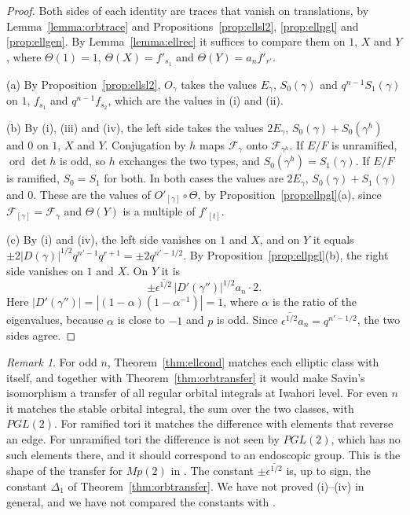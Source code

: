 \documentclass[12pt,letterpaper]{amsart}
\numberwithin{equation}{section}
\theoremstyle{definition}
\theoremstyle{remark}
\newtheorem{remark}[theorem]{Remark}
\DeclareMathOperator{\ord}{ord}
\begin{document}
\begin{proof}
Both sides of each identity are traces that vanish on translations, by
Lemma~\ref{lemma:orbtrace} and Propositions~\ref{prop:ellsl2},
\ref{prop:ellpgl} and \ref{prop:ellgen}. By Lemma~\ref{lemma:ellrec} it
suffices to compare them on $1$, $X$ and $Y$, where
$\Theta(1)=1$, $\Theta(X)=f'_{s_1}$ and $\Theta(Y)=a_nf'_{r'}$.

(a) By Proposition~\ref{prop:ellsl2}, $O_\gamma$ takes the values
$E_\gamma$, $S_0(\gamma)$ and $q^{n-1}S_1(\gamma)$ on $1$, $f_{s_1}$ and
$q^{n-1}f_{s_2}$, which are the values in (i) and (ii).

(b) By (i), (iii) and (iv), the left side takes the values
$2E_\gamma$, $S_0(\gamma)+S_0(\gamma^h)$ and $0$ on $1$, $X$ and $Y$.
Conjugation by $h$ maps $\mathcal F_\gamma$ onto $\mathcal
F_{\gamma^h}$. If $E/F$ is unramified, $\ord\det h$ is odd, so $h$
exchanges the two types, and $S_0(\gamma^h)=S_1(\gamma)$. If $E/F$ is
ramified, $S_0=S_1$ for both. In both cases the values are $2E_\gamma$,
$S_0(\gamma)+S_1(\gamma)$ and $0$. These are the values of
$O'_{[\gamma]}\circ\Theta$, by Proposition~\ref{prop:ellpgl}(a), since
$\mathcal F_{[\gamma]}=\mathcal F_\gamma$ and $\Theta(Y)$ is a multiple
of $f'_{[t]}$.

(c) By (i) and (iv), the left side vanishes on $1$ and $X$, and on $Y$
it equals $\pm2|D(\gamma)|^{1/2}q^{n'-1}q^{r+1}=\pm2q^{n'-1/2}$. By
Proposition~\ref{prop:ellpgl}(b), the right side vanishes on $1$ and
$X$. On $Y$ it is
\[
\pm\overline{\epsilon^{1/2}}\,|D'(\gamma'')|^{1/2}a_n\cdot2 .
\]
Here $|D'(\gamma'')|=|(1-\alpha)(1-\alpha^{-1})|=1$, where
$\alpha$ is the ratio of the eigenvalues, because $\alpha$ is close to
$-1$ and $p$ is odd. Since $\overline{\epsilon^{1/2}}a_n=q^{n'-1/2}$,
the two sides agree.
\end{proof}

\begin{remark}
\label{rem:ellmeaning}
For odd $n$, Theorem~\ref{thm:ellcond} matches each elliptic class with
itself, and together with Theorem~\ref{thm:orbtransfer} it would make
Savin's isomorphism a transfer of all regular orbital integrals at
Iwahori level. For even $n$ it matches the stable orbital integral, the
sum over the two classes, with $PGL(2)$. For ramified tori it matches
the difference with elements that reverse an edge. For unramified tori
the difference is not seen by $PGL(2)$, which has no such elements
there, and it should correspond to an endoscopic group. This is the
shape of the transfer for $Mp(2)$ in \cite{Li11}. The constant
$\pm\overline{\epsilon^{1/2}}$ is, up to sign, the constant $\Delta_1$
of Theorem~\ref{thm:orbtransfer}. We have not proved (i)--(iv) in
general, and we have not compared the constants with \cite{Li11}.
\end{remark}
\end{document}
